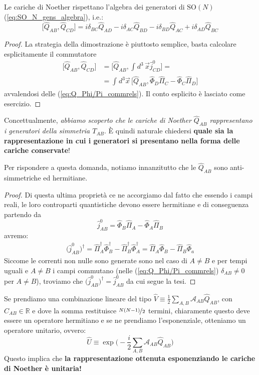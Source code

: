 \documentclass[../main.tex]{subfiles}
\begin{document}
Le cariche di Noether rispettano l'algebra dei generatori di $\textrm{SO}(N)$ (\ref{eq:SO_N_gens_algebra}), i.e.:
\begin{equation}
    \boxed{\big[\hat{Q}_{AB}, \hat{Q}_{CD}\big] = i\delta_{BC}\hat{Q}_{AD} - i\delta_{AC}\hat{Q}_{BD} - i\delta_{BD}\hat{Q}_{AC} + i\delta_{AD}\hat{Q}_{BC} }
    \label{eq:noether_charges_algebra}
\end{equation}

\begin{proof}
    La strategia della dimostrazione è piuttosto semplice, basta calcolare esplicitamente il commutatore
    \begin{align*}
        \big[\hat{Q}_{AB}, \hat{Q}_{CD}\big] &= \big[\hat{Q}_{AB}, \int_{}d^3\,\Vec{x}\hat{j}^0_{CD}\big] = \\
        &=\int_{}d^3\Vec{x}\,\big[\hat{Q}_{AB}, \hat{\Phi}_D\hat{\Pi}_C - \hat{\Phi}_C\hat{\Pi}_D\big]
    \end{align*}
    avvalendosi delle (\ref{eq:Q_Phi/Pi_commrels}). Il conto esplicito è lasciato come esercizio.
\end{proof}
Concettualmente, \textit{abbiamo scoperto che le cariche di Noether $\hat{Q}_{AB}$ rappresentano i generatori della simmetria $T_{AB}$}. È quindi naturale chiedersi \textbf{quale sia la rappresentazione in cui i generatori si presentano nella forma delle cariche conservate}!

Per rispondere a questa domanda, notiamo innanzitutto che le $\hat{Q}_{AB}$ sono anti-simmetriche ed hermitiane. 
\begin{proof}
Di questa ultima proprietà ce ne accorgiamo dal fatto che essendo i campi reali, le loro controparti quantistiche devono essere hermitiane e di conseguenza partendo da 
\[
\hat{j}^0_{AB} = \hat{\Phi}_B \hat{\Pi}_A- \hat{\Phi}_A \hat{\Pi}_B 
\]
avremo:
\begin{align*}
    \big(\hat{j}^0_{AB}\big)^\dagger = \hat{\Pi}_A^\dagger \hat{\Phi}_B^\dagger- \hat{\Pi}_B^\dagger \hat{\Phi}_A^\dagger = \hat{\Pi}_A \hat{\Phi}_B- \hat{\Pi}_B \hat{\Phi}_a 
\end{align*}
Siccome le correnti non nulle sono generate sono nel caso di $A\neq B$ e per tempi uguali e $A\neq B$ i campi commutano (nelle (\ref{eq:Q_Phi/Pi_commrels}) $\delta_{AB}\neq0$ per $A\neq B$), troviamo che $\big(\hat{j}^0_{AB}\big)^\dagger = \hat{j}^0_{AB}$ da cui segue la tesi.
\end{proof}

Se prendiamo una combinazione lineare del tipo $\hat{V} \equiv \frac{1}{2}\sum_{A,B}\mathscr{A}_{AB}\hat{Q}_{AB}$, con $C_{AB}\in \mathbb{R}$ e dove la somma restituisce $\nicefrac{N(N-1)}{2}$ termini, chiaramente questo deve essere un operatore hermitiano e se ne prendiamo l'esponenziale, otteniamo un operatore unitario, ovvero:
\[
\hat{U} \equiv \exp \bigg( -\frac{i}{2}\sum_{A,B}\mathscr{A}_{AB}\hat{Q}_{AB} \bigg)
\]
Questo implica che \textbf{la rappresentazione ottenuta esponenziando le cariche di Noether è unitaria!}
\end{document}
